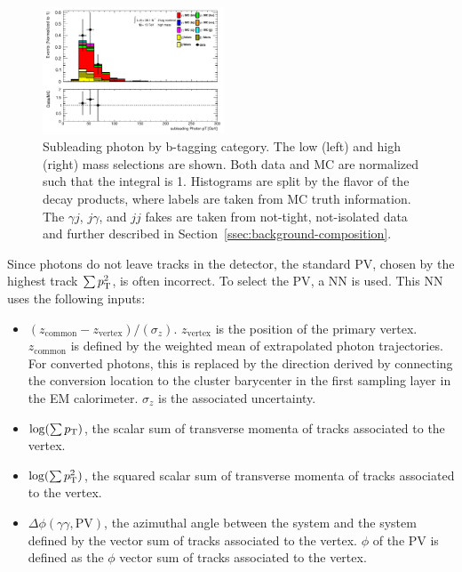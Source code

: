 \begin{figure}[p]
  \includegraphics[width=0.48\textwidth]{chapters/chapter5_yybb/images/data_MC_comparison/h_SR_h_2t_nominal_subleadingPhoton_pt.pdf}
  \caption[Subleading photon \pt by \btagging category]{Subleading photon \pt by b-tagging category. The low (left) and high (right) mass selections are shown. Both data and MC are normalized such that the integral is 1. Histograms are split by the flavor of the \Hbb decay products, where labels are taken from \gls{MC} truth information. The $\gamma j$, $j\gamma$, and $jj$ fakes are taken from not-tight, not-isolated data and further described in Section~\ref{ssec:background-composition}.
  \label{fig:photon_s_pt}}
\end{figure}

Since photons do not leave tracks in the detector, the standard \gls{PV}, chosen by the highest track $\sum p_{\text{T}}^2$, is often incorrect. To select the \gls{PV}, a \gls{NN} is used. This \gls{NN} uses the following inputs:
\begin{itemize}
  \item $(z_{\text{common}} - z_{\text{vertex}})/(\sigma_z)$. $z_{\text{vertex}}$ is the position of the primary vertex. $z_{\text{common}}$ is defined by the weighted mean of extrapolated photon trajectories. For converted photons, this is replaced by the direction derived by connecting the conversion location to the cluster barycenter in the first sampling layer in the \gls{EM} calorimeter. $\sigma_z$ is the associated uncertainty.
  \item $\log(\sum p_{\text{T}})$, the scalar sum of transverse momenta of tracks associated to the vertex.
  \item $\log(\sum p_{\text{T}}^2)$, the squared scalar sum of transverse momenta of tracks associated to the vertex.
  \item $\Delta \phi(\gamma\gamma,\text{PV})$, the azimuthal angle between the \yy system and the system defined by the vector sum of tracks associated to the vertex. $\phi$ of the \gls{PV} is defined as the $\phi$ vector sum of tracks associated to the vertex.
\end{itemize}
  
